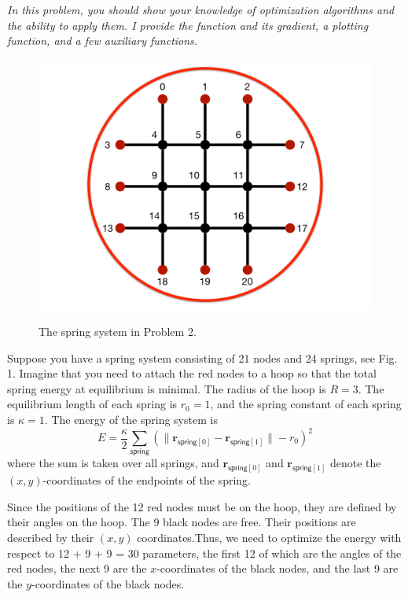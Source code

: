 \documentclass{../kin_math}
\begin{document}
\begin{questions}
  \question \emph{In this problem, you should show your knowledge of optimization algorithms and the ability to apply them. I provide the function and its gradient, a plotting function, and a few auxiliary functions.}
  \begin{figure}
    \centering
    \includegraphics[scale=0.2]{springs.pdf}
    \label{fig:springs}
    \caption{The spring system in Problem 2.}
  \end{figure}
  Suppose you have a spring system consisting of 21 nodes and 24 springs, see Fig. 1. Imagine that you need to attach the red nodes to a hoop so that the total spring energy at equilibrium is minimal. The radius of the hoop is $R = 3$. The equilibrium length of each spring is $r_0 = 1$, and the spring constant of each spring is $\kappa = 1$. The energy of the spring system is
  \begin{equation}
    E = \frac{\kappa}{2} \sum_\textsf{spring} \left(\| \textbf{r}_{\textsf{spring}[0]} - \textbf{r}_{\textsf{spring}[1]} \| - r_0\right)^2
  \end{equation}
  where the sum is taken over all springs, and $\textbf{r}_{\textsf{spring}[0]}$ and $\textbf{r}_{\textsf{spring}[1]}$ denote the $(x, y)$-coordinates of the endpoints of the spring.

  Since the positions of the 12 red nodes must be on the hoop, they are defined by their angles on the hoop. The 9 black nodes are free. Their positions are described by their $(x, y)$ coordinates.Thus, we need to optimize the energy with respect to 12 + 9 + 9 = 30 parameters, the first 12 of which are the angles of the red nodes, the next 9 are the $x$-coordinates of the black nodes, and the last 9 are the $y$-coordinates of the black nodes.


\end{questions}
\end{document}
